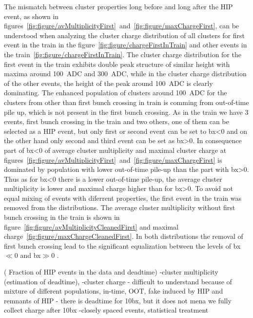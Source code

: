 The mismatch between cluster properties long before and long after the HIP event, as shown in figures~\ref{fig:figure/avMultiplicityFirst}~and~\ref{fig:figure/maxChargeFirst}, can be understood when analyzing the cluster charge distribution of all clusters for first event in the train in the figure~\ref{fig:figure/chargeFirstInTrain} and other events in the train~\ref{fig:figure/chargeFirstInTrain}. The cluster charge distribution for the first event in the train exhibits double peak structure of similar height with maxima around 100~ADC and 300~ADC, while in the cluster charge distribution of the other events, the height of the peak around 100~ADC is clearly dominating. The enhanced population of clusters around 100~ADC for the clusters from other than first bunch crossing in train is comming from out-of-time pile up, which is not present in the first bunch crossing. As in the train we have 3 events, first bunch crossing in the train and two others, one of them can be selected as a HIP event, but only first or second event can be set to bx<0 and on the other hand only second and third event can be set as bx>0. In consequence part of bx<0 of average cluster multiplicity and maximal cluster charge at figures~\ref{fig:figure/avMultiplicityFirst}~and~\ref{fig:figure/maxChargeFirst} is dominated by population with lower out-of-time pile-up than the part with bx>0. Thus as for bx<0 there is a lower out-of-time pile-up, the average cluster multiplicity is lower and maximal charge higher than for bx>0. To avoid not equal mixing of events with diferrent properties, the first event in the train was removed from the distributions. The average cluster multiplicity without first bunch crossing in the train is shown in figure~\ref{fig:figure/avMultiplicityCleanedFirst} and maximal charge~\ref{fig:figure/maxChargeCleanedFirst}. In both distributions the removal of first bunch crossing lead to the significant equalization between the levels of bx$\ll$0 and bx$\gg$0 .


     ( Fraction of HIP events in the data and deadtime)     
-cluster multiplicity (estimation of deadtime), 
-cluster charge - difficult to understand because of mixture of different populations, in-time, OOT, fake induced by HIP and remnants of HIP
- there is deadtime for 10bx, but it does not mena we fully collect charge after 10bx
-closely spaced events, statistical treatment

